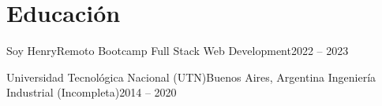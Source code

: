 
\section{Educación}
\vspace{3pt}

\resumeSubHeadingListStart

\resumeSubheading
{Soy Henry}{Remoto}
{Bootcamp Full Stack Web Development}{2022 -- 2023}

\resumeSubheading
{Universidad Tecnológica Nacional (UTN)}{Buenos Aires, Argentina}
{Ingeniería Industrial (Incompleta)}{2014 -- 2020}

\resumeSubHeadingListEnd
